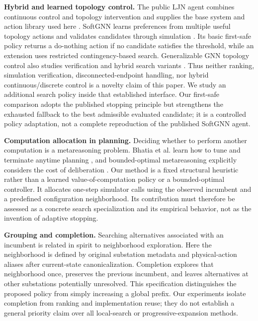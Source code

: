 \textbf{Hybrid and learned topology control.} The public LJN agent combines continuous control and topology intervention and supplies the base system and action library used here \citep{ljn2023agent}. SoftGNN learns preferences from multiple useful topology actions and validates candidates through simulation \citep{hassouna2025softgnn}. Its basic first-safe policy returns a do-nothing action if no candidate satisfies the threshold, while an extension uses restricted contingency-based search. Generalizable GNN topology control also studies verification and hybrid search variants \citep{dejong2025generalizablev1}. Thus neither ranking, simulation verification, disconnected-endpoint handling, nor hybrid continuous/discrete control is a novelty claim of this paper. We study an additional search policy inside that established interface. Our first-safe comparison adopts the published stopping principle but strengthens the exhausted fallback to the best admissible evaluated candidate; it is a controlled policy adaptation, not a complete reproduction of the published SoftGNN agent.


\textbf{Computation allocation in planning.} Deciding whether to perform another computation is a metareasoning problem. Bhatia et al. learn how to tune and terminate anytime planning \citep{bhatia2022metareasoning}, and bounded-optimal metareasoning explicitly considers the cost of deliberation \citep{milli2017metareasoning}. Our method is a fixed structural heuristic rather than a learned value-of-computation policy or a bounded-optimal controller. It allocates one-step simulator calls using the observed incumbent and a predefined configuration neighborhood. Its contribution must therefore be assessed as a concrete search specialization and its empirical behavior, not as the invention of adaptive stopping.


\textbf{Grouping and completion.} Searching alternatives associated with an incumbent is related in spirit to neighborhood exploration. Here the neighborhood is defined by original substation metadata and physical-action aliases after current-state canonicalization. Completion explores that neighborhood once, preserves the previous incumbent, and leaves alternatives at other substations potentially unresolved. This specification distinguishes the proposed policy from simply increasing a global prefix. Our experiments isolate completion from ranking and implementation reuse; they do not establish a general priority claim over all local-search or progressive-expansion methods.



